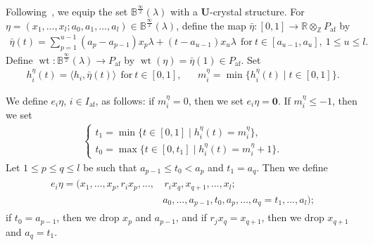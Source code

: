 \documentclass[10pt]{amsart}
\theoremstyle{definition}\newtheorem{defi}[theo]{Definition}
\theoremstyle{remark}\newtheorem{rema}[theo]{Remark}
\newcommand{\BR}{\mathbb{R}}
\newcommand{\BZ}{\mathbb{Z}}
\newcommand\bm[1]{\boldsymbol{#1}}
\newcommand{\U}{\mathbf{U}}
\newcommand{\si}{\frac{\infty}{2}}
\DeclareMathOperator{\af}{af}
\DeclareMathOperator{\wt}{wt}
\begin{document}
Following~\cite[\S~3.1]{INS16}, 
we equip the set 
$\mathbb{B}^{\si}(\lambda)$ 
with a $\U$-crystal structure.
For 
$\eta = (x_1 , \ldots , x_l ; a_0 , a_1 , \ldots , a_l) \in \mathbb{B}^{\si}(\lambda)$, 
define the map 
$\bar{\eta} : [0,1] \rightarrow \BR \otimes_{\BZ} P_{\af}$ 
by
\begin{align} \label{eq:path}
\bar{\eta}(t) 
=
\sum_{p=1}^{u-1} (a_p - a_{p-1}) x_p \lambda + (t - a_{u-1}) x_u \lambda 
\ \ 
\text{for} \ 
t \in [a_{u-1} , a_u], \ 
1 \leq u \leq l.
\end{align}
Define 
$\wt : \mathbb{B}^{\si}(\lambda) \rightarrow P_{\af}$
by
$\wt (\eta) = \bar{\eta}(1) \in P_{\af}$.
Set
\begin{align} \label{eq:path-h-m}
h_i^{\eta}(t) 
= 
\langle h_i , \bar{\eta}(t) \rangle 
\ \ \text{for}\ 
t \in [0,1] , &&
m_i^{\eta} 
= 
\min \{ h_i^{\eta}(t) \mid t \in [0,1] \} .
\end{align}

We define 
$e_i \eta$, $i \in I_{\af}$, 
as follows: 
if $m_i^{\eta} = 0$, 
then we set $e_i \eta = \bm{0}$.
If $m_i^{\eta} \leq -1$, then we set
\begin{align} \label{eq:e_i-t}
\begin{cases}
t_1 = \min \{ t \in [0,1] \mid h_i^{\eta}(t) = m_i^{\eta} \} , \\%
t_0 = \max \{ t \in [0,t_1] \mid h_i^{\eta}(t) = m_i^{\eta} + 1 \} .
\end{cases}
\end{align}
Let 
$1 \leq p \leq q \leq l$
be such that 
$a_{p-1} \leq t_0 < a_p$ and $t_1 = a_q$. 
Then we define 
\begin{align} \label{eq:e_i}
\begin{split}
e_i \eta 
= 
(x_1 , \ldots , x_p , r_i x_p , \ldots , 
&\, r_i x_q , x_{q+1} , \ldots , x_l ; \\
&a_0 , \ldots , a_{p-1} , t_0 , a_p , \ldots , a_q = t_1 , \ldots , a_l ) ;
\end{split}
\end{align}
if $t_0 = a_{p-1}$, 
then we drop $x_p$ and $a_{p-1}$, 
and if $r_j x_q = x_{q+1}$, 
then we drop $x_{q+1}$ and $a_q = t_1$.
\end{document}
